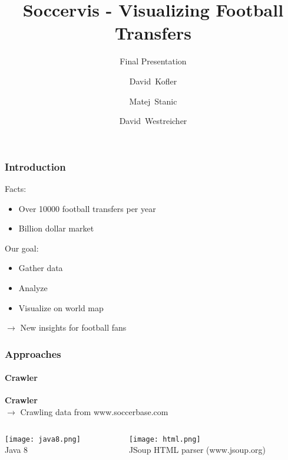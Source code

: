 \documentclass{beamer}
\title[Soccervis] %
{Soccervis - Visualizing Football Transfers}
\subtitle{Final Presentation}
\author[Kofler, Stanic, Westreicher] %
{David~Kofler \and Matej~Stanic \and David~Westreicher}
\begin{document}
\frame{\titlepage}


  \begin{frame}
    \frametitle{Introduction}
		Facts:
		\begin{itemize}
			\item Over 10000 football transfers per year
			\item Billion dollar market 
		\end{itemize}
		Our goal: 
		\begin{itemize}
			\item Gather data
			\item Analyze
			\item Visualize on world map
		\end{itemize}
		$\rightarrow$ New insights for football fans
  \end{frame}
	
  \begin{frame}
    \frametitle{Approaches}
		\framesubtitle{Crawler}
		\textbf{Crawler} \\ 
		$\rightarrow$ Crawling data from www.soccerbase.com
		\begin{columns}[T] %
    \begin{column}[T]{5cm} %
			\begin{center}
      \texttt{[image: java8.png]}\\
			Java 8
			\end{center}
    \end{column}
    \begin{column}[T]{5cm} %
		\begin{center}
		 \texttt{[image: html.png]} \\ 
			JSoup HTML parser (www.jsoup.org)
		\end{center}	
    \end{column}
    \end{columns}   
  \end{frame}
	
\end{document}

